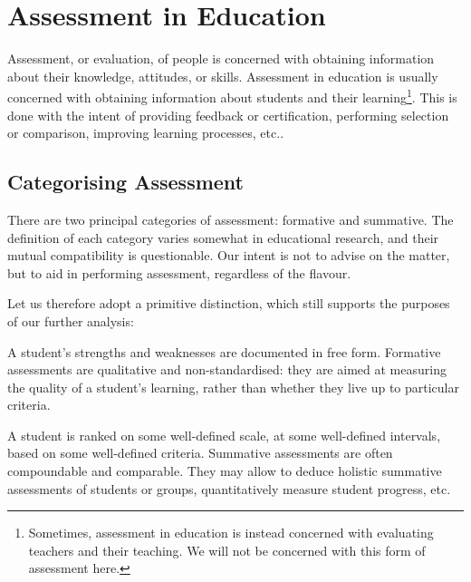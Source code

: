 
\section{Assessment in Education}

\label{section:assessment-in-education}


Assessment, or evaluation, of people is concerned with obtaining information
about their knowledge, attitudes, or skills. Assessment in education is usually
concerned with obtaining information about students and their
learning\footnote{Sometimes, assessment in education is instead concerned with
evaluating teachers and their teaching. We will not be concerned with this form
of assessment here.}\cite{ramsden-1992,assessment-and-burnout}. This is done
with the intent of providing feedback or certification, performing selection or
comparison, improving learning processes, etc.\cite{first-ten-years}.

\subsection{Categorising Assessment}

There are two principal categories of assessment: formative and summative.  The
definition of each category varies somewhat in educational
research\cite{bloom1971, sadler1989, formative-vs-summative}, and their mutual
compatibility is questionable\cite{butler1988}. Our intent is not to advise on
the matter, but to aid in performing assessment, regardless of the flavour.

Let us therefore adopt a primitive distinction, which still supports the
purposes of our further analysis:

\begin{description}[\setleftmargin{60pt}\setlabelstyle{\bf}]

\item[Formative] A student's strengths and weaknesses are documented in free
form. Formative assessments are qualitative and non-standard\-ised: they are
aimed at measuring the quality of a student's learning, rather than whether
they live up to particular criteria. 

\item[Summative] A student is ranked on some well-defined scale, at some
well-defined intervals, based on some well-defined criteria. Summative
assessments are often compoundable and comparable. They may allow to deduce
holistic summative assessments of students or groups, quantitatively measure
student progress, etc.

\end{description}


